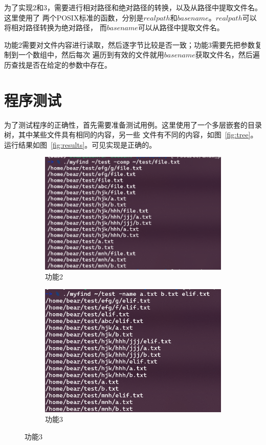 \documentclass[a4paper,twoside]{article}
\begin{document}
\begin{spacing}{1.2}
为了实现2和3，需要进行相对路径和绝对路径的转换，以及从路径中提取文件名。这里使用了
两个POSIX标准的函数，分别是$realpath$和$basename$。$realpath$可以将相对路径转换为绝对路径，
而$basename$可以从路径中提取文件名。

功能2需要对文件内容进行读取，然后逐字节比较是否一致；功能3需要先把参数复制到一个数组中，然后每次
遍历到有效的文件就用$basename$获取文件名，然后遍历查找是否在给定的参数中存在。

\section{程序测试}

为了测试程序的正确性，首先需要准备测试用例。这里使用了一个多层嵌套的目录树，其中某些文件具有相同的内容，另一些
文件有不同的内容，如图~\ref{fig:tree}。运行结果如图~\ref{fig:results}。可见实现是正确的。

\begin{figure}[htb]
	\centering
	\caption{运行结果}
	\label{fig:results}
	\begin{subfigure}{0.4\textwidth}
		\centering
		\includegraphics[width=\textwidth]{f2.png}
		\caption{功能2}
		\label{fig:f2}
	\end{subfigure}
	\begin{subfigure}{0.4\textwidth}
		\centering
		\includegraphics[width=\textwidth]{f3.png}
		\caption{功能3}
		\label{fig:f3}
	\end{subfigure}
\end{figure}



\end{spacing}
\end{document}
